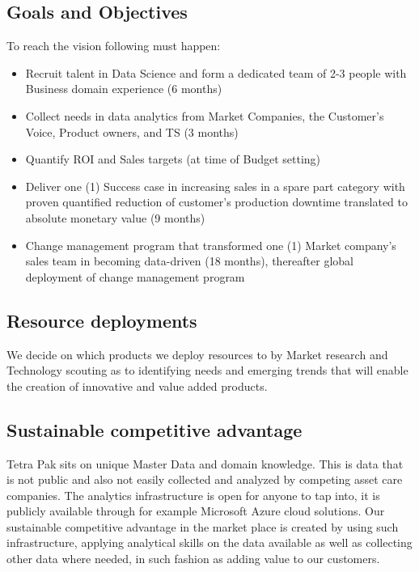 \documentclass[10pt]{article} %
\begin{document}
\subsection{Goals and Objectives}

To reach the vision following must happen:
\begin{itemize}
				\item Recruit talent in Data Science and form a dedicated team of 2-3 people with Business domain experience (6 months)
				\item Collect needs in data analytics from Market Companies, the Customer's Voice, Product owners, and TS (3 months)
				\item Quantify ROI and Sales targets (at time of Budget setting)
				\item Deliver one (1) Success case in increasing sales in a spare part category with proven quantified reduction of customer's production downtime translated to absolute monetary value (9 months)
				\item Change management program that transformed one (1) Market company's sales team in becoming data-driven (18 months), thereafter global deployment of change management program
\end{itemize}

\subsection{Resource deployments}

We decide on which products we deploy resources to by Market research and Technology scouting as to identifying needs and emerging trends that will enable the creation of innovative and value added products.

\subsection{Sustainable competitive advantage}

Tetra Pak sits on unique Master Data and domain knowledge. This is data that is not public and also not easily collected and analyzed by competing asset care companies. The analytics infrastructure is open for anyone to tap into, it is publicly available through for example Microsoft Azure cloud solutions. Our sustainable competitive advantage in the market place is created by using such infrastructure, applying analytical skills on the data available as well as collecting other data where needed, in such fashion as adding value to our customers. 
\end{document}
